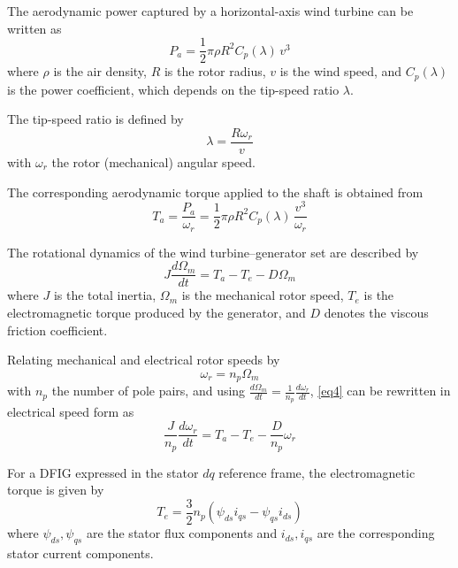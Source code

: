 \documentclass[conference]{IEEEtran}
\begin{document}
The aerodynamic power captured by a horizontal-axis wind turbine can be written as \cite{b21,b22,b23}
\begin{equation}
P_{a} = \frac{1}{2}\pi\rho R^{2}C_{p}(\lambda)\, v^{3}
\label{eq1}
\end{equation}
where $\rho$ is the air density, $R$ is the rotor radius, $v$ is the wind speed, and $C_{p}(\lambda)$ is the power coefficient, which depends on the tip-speed ratio $\lambda$.

The tip-speed ratio is defined by
\begin{equation}
\lambda = \frac{R\omega_{r}}{v}
\label{eq2}
\end{equation}
with $\omega_{r}$ the rotor (mechanical) angular speed.

The corresponding aerodynamic torque applied to the shaft is obtained from
\begin{equation}
T_{a} = \frac{P_{a}}{\omega_{r}} = \frac{1}{2}\pi\rho R^{2}C_{p}(\lambda)\,\frac{v^{3}}{\omega_{r}}
\label{eq3}
\end{equation}

The rotational dynamics of the wind turbine--generator set are described by
\begin{equation}
J\frac{d\Omega_{m}}{dt} = T_{a} - T_{e} - D\Omega_{m}
\label{eq4}
\end{equation}
where $J$ is the total inertia, $\Omega_{m}$ is the mechanical rotor speed, $T_{e}$ is the electromagnetic torque produced by the generator, and $D$ denotes the viscous friction coefficient.

Relating mechanical and electrical rotor speeds by
\begin{equation}
\omega_{r} = n_{p}\Omega_{m}
\label{eq5}
\end{equation}
with $n_{p}$ the number of pole pairs, and using $\frac{d\Omega_{m}}{dt} = \frac{1}{n_{p}}\frac{d\omega_{r}}{dt}$, \eqref{eq4} can be rewritten in electrical speed form as
\begin{equation}
\frac{J}{n_{p}}\frac{d\omega_{r}}{dt} = T_{a} - T_{e} - \frac{D}{n_{p}}\omega_{r}
\label{eq6}
\end{equation}

For a DFIG expressed in the stator $dq$ reference frame, the electromagnetic torque is given by
\begin{equation}
T_{e} = \frac{3}{2}n_{p}\left( \psi_{ds}i_{qs} - \psi_{qs}i_{ds} \right)
\label{eq7}
\end{equation}
where $\psi_{ds},\psi_{qs}$ are the stator flux components and $i_{ds},i_{qs}$ are the corresponding stator current components.
\end{document}
